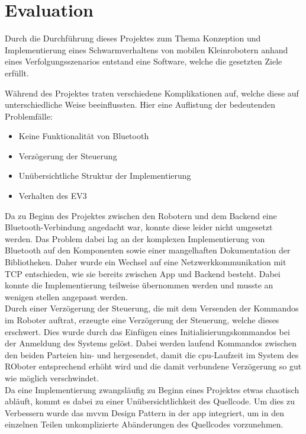 \section{Evaluation}

Durch die Durchführung dieses Projektes zum Thema \glqq{}Konzeption und Implementierung eines Schwarmverhaltens von mobilen Kleinrobotern anhand eines Verfolgungsszenarios\grqq{} entstand eine Software, welche die gesetzten Ziele erfüllt.

Während des Projektes traten verschiedene Komplikationen auf, welche diese auf unterschiedliche Weise beeinflussten. Hier eine Auflistung der bedeutenden Problemfälle:

\begin{itemize}
	\item Keine Funktionalität von Bluetooth
	\item Verzögerung der Steuerung
	\item Unübersichtliche Struktur der Implementierung
	\item Verhalten des EV3
\end{itemize}

\noindent
Da zu Beginn des Projektes zwischen den Robotern und dem Backend eine Bluetooth-Verbindung angedacht war, konnte diese leider nicht umgesetzt werden. Das Problem dabei lag an der komplexen Implementierung von Bluetooth auf den Komponenten sowie einer mangelhaften Dokumentation der Bibliotheken. Daher wurde ein Wechsel auf eine Netzwerkkommunikation mit TCP entschieden, wie sie bereits zwischen App und Backend besteht. Dabei konnte die Implementierung teilweise übernommen werden und musste an wenigen stellen angepasst werden.\\

\noindent
Durch einer Verzögerung der Steuerung, die mit dem Versenden der Kommandos im Roboter auftrat, erzeugte eine Verzögerung der Steuerung, welche dieses erschwert. Dies wurde durch das Einfügen eines Initialisierungskommandos bei der Anmeldung des Systems gelöst. Dabei werden laufend Kommandos zwischen den beiden Parteien hin- und hergesendet, damit die \gls{cpu}-Laufzeit im System des ROboter entsprechend erhöht wird und die damit verbundene Verzögerung so gut wie möglich verschwindet.\\

\noindent
Da eine Implementierung zwangsläufig zu Beginn eines Projektes etwas chaotisch abläuft, kommt es dabei zu einer Unübersichtlichkeit des Quellcode. Um dies zu Verbessern wurde das \gls{mvvm} Design Pattern in der \gls{app} integriert, um in den einzelnen Teilen unkomplizierte Abänderungen des Quellcodes vorzunehmen.\\

